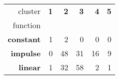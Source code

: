 \begin{tabular}{r|rrrrr}
cluster & \textbf{1} & \textbf{2} & \textbf{3} & \textbf{4} & \textbf{5} \\
function &  &  &  &  &  \\
\hline
\textbf{constant} & {\cellcolor[HTML]{73A9CF}} \color[HTML]{F1F1F1} 1 & {\cellcolor[HTML]{023858}} \color[HTML]{F1F1F1} 2 & {\cellcolor[HTML]{FFF7FB}} \color[HTML]{000000} 0 & {\cellcolor[HTML]{FFF7FB}} \color[HTML]{000000} 0 & {\cellcolor[HTML]{FFF7FB}} \color[HTML]{000000} 0 \\
\textbf{impulse} & {\cellcolor[HTML]{FFF7FB}} \color[HTML]{000000} 0 & {\cellcolor[HTML]{023858}} \color[HTML]{F1F1F1} 48 & {\cellcolor[HTML]{2D8ABD}} \color[HTML]{F1F1F1} 31 & {\cellcolor[HTML]{B4C4DF}} \color[HTML]{000000} 16 & {\cellcolor[HTML]{DEDCEC}} \color[HTML]{000000} 9 \\
\textbf{linear} & {\cellcolor[HTML]{FFF7FB}} \color[HTML]{000000} 1 & {\cellcolor[HTML]{5EA0CA}} \color[HTML]{F1F1F1} 32 & {\cellcolor[HTML]{023858}} \color[HTML]{F1F1F1} 58 & {\cellcolor[HTML]{FDF5FA}} \color[HTML]{000000} 2 & {\cellcolor[HTML]{FFF7FB}} \color[HTML]{000000} 1 \\
\end{tabular}
